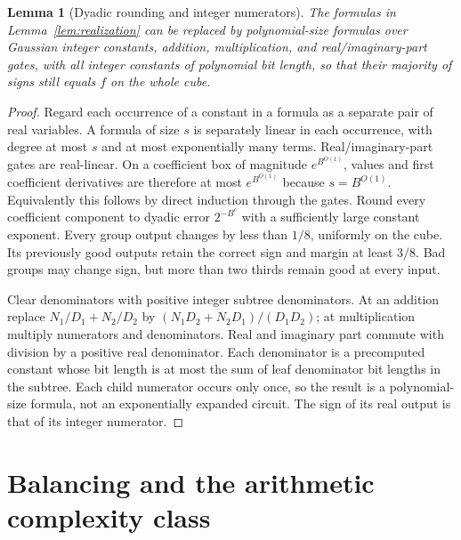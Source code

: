 \documentclass[11pt]{article}
\newtheorem{lemma}[theorem]{Lemma}
\theoremstyle{remark}\newtheorem{remark}[theorem]{Remark}
\begin{document}
\begin{lemma}[Dyadic rounding and integer numerators]
\label{lem:round}
The formulas in Lemma~\ref{lem:realization} can be replaced by
polynomial-size formulas over Gaussian integer constants, addition,
multiplication, and real/imaginary-part gates, with all integer constants
of polynomial bit length, so that their majority of signs still equals
$f$ on the whole cube.
\end{lemma}
\begin{proof}
Regard each occurrence of a constant in a formula as a separate pair
of real variables. A formula of size $s$ is separately linear in each
occurrence, with degree at most $s$ and at most exponentially many
terms. Real/imaginary-part gates are real-linear. On a coefficient box
of magnitude $e^{B^{O(1)}}$, values and first coefficient derivatives
are therefore at most $e^{B^{O(1)}}$ because $s=B^{O(1)}$.
Equivalently this follows by direct induction through the gates.
Round every coefficient component to dyadic error $2^{-B^c}$ with
a sufficiently large constant exponent. Every group output changes by
less than $1/8$, uniformly on the cube. Its previously good outputs
retain the correct sign and margin at least $3/8$. Bad groups may
change sign, but more than two thirds remain good at every input.

Clear denominators with positive integer subtree denominators. At an
addition replace $N_1/D_1+N_2/D_2$ by
$(N_1D_2+N_2D_1)/(D_1D_2)$; at multiplication multiply numerators
and denominators. Real and imaginary part commute with division by
a positive real denominator. Each denominator is a precomputed
constant whose bit length is at most the sum of leaf denominator bit
lengths in the subtree. Each child numerator occurs only once, so the
result is a polynomial-size formula, not an exponentially expanded
circuit. The sign of its real output is that of its integer numerator.
\end{proof}

\section{Balancing and the arithmetic complexity class}
\end{document}
